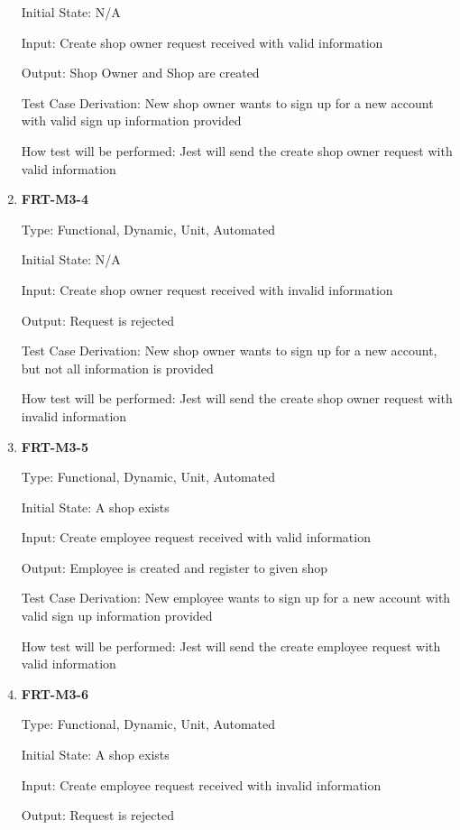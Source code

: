 \documentclass[12pt, titlepage]{article}
\begin{document}
\begin{enumerate}
	      Initial State: N/A

	      Input: Create shop owner request received with valid information

	      Output: Shop Owner and Shop are created

	      Test Case Derivation: New shop owner wants to sign up for a new account with valid sign up
	      information provided

	      How test will be performed: Jest will send the create shop owner request with valid information

	\item \textbf{FRT-M3-4}

	      Type: Functional, Dynamic, Unit, Automated

	      Initial State: N/A

	      Input: Create shop owner request received with invalid information

	      Output: Request is rejected

	      Test Case Derivation: New shop owner wants to sign up for a new account, but not all information is
	      provided

	      How test will be performed: Jest will send the create shop owner request with invalid information

	\item \textbf{FRT-M3-5}

	      Type: Functional, Dynamic, Unit, Automated

	      Initial State: A shop exists

	      Input: Create employee request received with valid information

	      Output: Employee is created and register to given shop

	      Test Case Derivation: New employee wants to sign up for a new account with valid sign up
	      information provided

	      How test will be performed: Jest will send the create employee request with valid information

	\item \textbf{FRT-M3-6}

	      Type: Functional, Dynamic, Unit, Automated

	      Initial State: A shop exists

	      Input: Create employee request received with invalid information

	      Output: Request is rejected


\end{enumerate}
\end{document}
